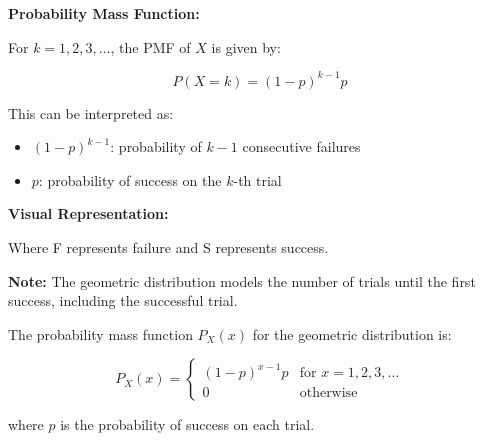 \documentclass{article}
\begin{document}
    \textbf{Probability Mass Function:}

    For $k = 1, 2, 3, \ldots$, the PMF of $X$ is given by:

    \[
    P(X = k) = (1-p)^{k-1} p
    \]

    This can be interpreted as:
    \begin{itemize}
        \item $(1-p)^{k-1}$: probability of $k-1$ consecutive failures
        \item $p$: probability of success on the $k$-th trial
    \end{itemize}

    \textbf{Visual Representation:}


    Where F represents failure and S represents success.

    \textbf{Note:} The geometric distribution models the number of trials until the first success, including the successful trial.

    The probability mass function $P_X(x)$ for the geometric distribution is:

    \[
    P_X(x) = 
    \begin{cases}
        (1-p)^{x-1}p & \text{for } x = 1, 2, 3, \ldots \\
        0 & \text{otherwise}
    \end{cases}
    \]

    where $p$ is the probability of success on each trial.
\end{document}
